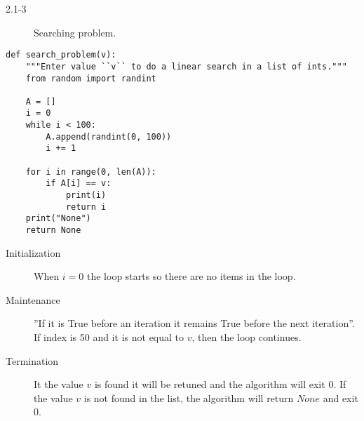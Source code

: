 \begin{description}
 \item[2.1-3] Searching problem.
\end{description}
\begin{lstlisting}
def search_problem(v):
    """Enter value ``v`` to do a linear search in a list of ints."""
    from random import randint

    A = []
    i = 0
    while i < 100:
        A.append(randint(0, 100))
        i += 1

    for i in range(0, len(A)):
        if A[i] == v:
            print(i)
            return i
    print("None")
    return None
\end{lstlisting}

\begin{description}
 \item[Initialization] When $i = 0$ the loop starts so there are no items in the loop.
 \item[Maintenance] ''If it is True before an iteration it remains True before the next iteration''.
    If index is 50 and it is not equal to $v$, then the loop continues.
 \item[Termination] It the value $v$ is found it will be retuned and the algorithm will exit $0$. If
    the value $v$ is not found in the list, the algorithm will return $None$ and exit $0$.
\end{description}
